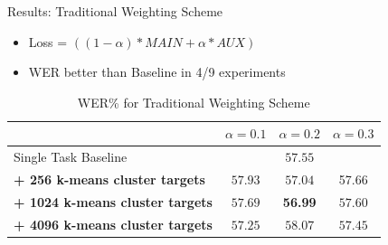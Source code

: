 \documentclass[final]{beamer} %
\begin{document}
\begin{frame}
\begin{columns}
\begin{column}{0.23\textwidth}
{        \vspace{1cm}
        
        \begin{block}{\boxnumber Results: Traditional Weighting Scheme}
          \begin{itemize}
          \item Loss = $((1-\alpha)*MAIN + \alpha*AUX)$
          \item WER better than Baseline in 4/9 experiments
          \end{itemize}
        \end{block}

        
        \vfill
        

                  
          \begin{table}[!htbp]
            \centering
            \caption{WER\% for Traditional Weighting Scheme}
            \begin{adjustbox}{width=\textwidth}
              \begin{tabular}{lccc}
                \toprule
                & $\alpha = 0.1 $ & $\alpha = 0.2 $ & $\alpha = 0.3 $\\
                \midrule
                Single Task Baseline  &  \multicolumn{3}{c}{$57.55$ \raisebox{.33\height}{\footnotesize{$\pm 1.82$}}}     \\
                
                \textbf{+ 256 k-means cluster targets}  &  $57.93$ \raisebox{.33\height}{\footnotesize{$\pm 1.63$}}   &  $57.04$ \raisebox{.33\height}{\footnotesize{$\pm 1.58$}}     & 57.66 \raisebox{.33\height}{\footnotesize{$\pm 1.24$}} \\
                
                \textbf{+ 1024 k-means cluster targets}   & $57.69$ \raisebox{.33\height}{\footnotesize{$\pm 3.78$}}    & \textbf{56.99} \raisebox{.33\height}{\footnotesize{$\pm 3.08$}}    & $57.60$ \raisebox{.33\height}{\footnotesize{$\pm 0.79$}}  \\
                
                \textbf{+ 4096 k-means cluster targets}   &  $57.25$ \raisebox{.33\height}{\footnotesize{$\pm 2.87$}}  & $58.07$ \raisebox{.33\height}{\footnotesize{$\pm 1.35$}}   &   $57.45$ \raisebox{.33\height}{\footnotesize{$\pm 0.32$}}  \\
                \bottomrule
              \end{tabular}
            \end{adjustbox}
          \end{table}


}
\end{column}
\end{columns}
\end{frame}
\end{document}

